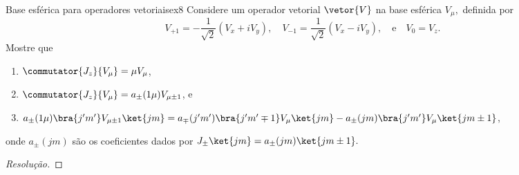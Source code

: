 \begin{exercício}{Base esférica para operadores vetoriais}{ex8}
    Considere um operador vetorial \(\vetor{V}\) na base esférica \(V_\mu,\) definida por
    \begin{equation*}
        V_{+1} = -\frac1{\sqrt{2}} (V_x + i V_y),
        \quad
        V_{-1} = \frac1{\sqrt{2}} (V_x - i V_y),
        \quad\text{e}\quad
        V_0 = V_z.
    \end{equation*}
    Mostre que
    \begin{enumerate}[label=(\alph*)]
        \item \(\commutator{J_z}{V_\mu} = \mu V_\mu\),
        \item \(\commutator{J_z}{V_\mu} = a_{\pm}(1\mu) V_{\mu \pm 1}\), e
        \item \(a_{\pm}(1\mu) \bra{j' m'} V_{\mu \pm 1} \ket{j m} = a_{\mp}(j'm') \bra{j'm' \mp 1} V_\mu \ket{j m} - a_{\pm}(jm) \bra{j'm'} V_\mu \ket{j m \pm 1}\),
    \end{enumerate}
    onde \(a_{\pm}(jm)\) são os coeficientes dados por \(J_{\pm} \ket{jm} = a_{\pm}(jm) \ket{j m\pm1}.\)
\end{exercício}
\begin{proof}[Resolução]
    
\end{proof}
